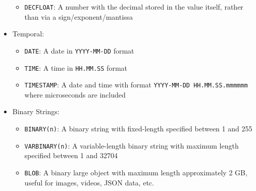 \documentclass[a4paper]{article}
\begin{document}
\begin{itemize}
\begin{itemize}
\item \texttt{DECFLOAT}: A number with the decimal stored in the value itself, rather than via a sign/exponent/mantissa
\end{itemize}
\item Temporal:
\begin{itemize}
\item \texttt{DATE}: A date in \texttt{YYYY-MM-DD} format
\item \texttt{TIME}: A time in \texttt{HH.MM.SS} format
\item \texttt{TIMESTAMP}: A date and time with format \texttt{YYYY-MM-DD HH.MM.SS.mmmmmm} where microseconds are included
\end{itemize}
\item Binary Strings:
\begin{itemize}
\item \texttt{BINARY(n)}: A binary string with fixed-length specified between 1 and 255
\item \texttt{VARBINARY(n)}: A variable-length binary string with maximum length specified between 1 and 32704
\item \texttt{BLOB}: A binary large object with maximum length approximately 2 GB, useful for images, videos, JSON data, etc.
\end{itemize}
\end{itemize}
\end{document}
